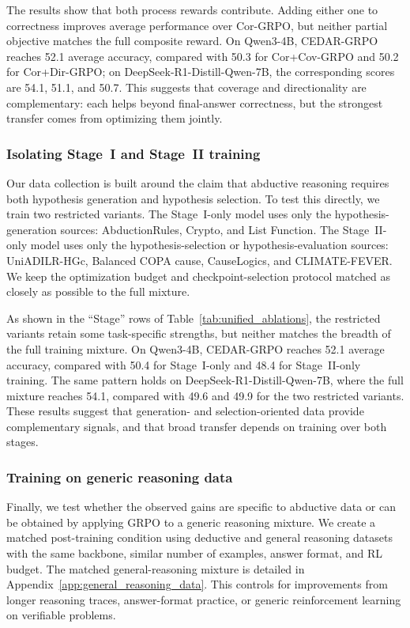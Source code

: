 \documentclass[11pt]{article}
\begin{document}
The results show that both process rewards contribute. Adding either one to correctness improves average performance over Cor-GRPO, but neither partial objective matches the full composite reward. On Qwen3-4B, CEDAR-GRPO reaches 52.1 average accuracy, compared with 50.3 for Cor+Cov-GRPO and 50.2 for Cor+Dir-GRPO; on DeepSeek-R1-Distill-Qwen-7B, the corresponding scores are 54.1, 51.1, and 50.7. This suggests that coverage and directionality are complementary: each helps beyond final-answer correctness, but the strongest transfer comes from optimizing them jointly.


\subsubsection{Isolating Stage~I and Stage~II training}
\label{sec:ablation_stages}

Our data collection is built around the claim that abductive reasoning requires both hypothesis generation and hypothesis selection. To test this directly, we train two restricted variants. The Stage~I-only model uses only the hypothesis-generation sources: AbductionRules, Crypto, and List Function. The Stage~II-only model uses only the hypothesis-selection or hypothesis-evaluation sources: UniADILR-HGc, Balanced COPA cause, CauseLogics, and CLIMATE-FEVER. We keep the optimization budget and checkpoint-selection protocol matched as closely as possible to the full mixture.

As shown in the ``Stage'' rows of Table~\ref{tab:unified_ablations}, the restricted variants retain some task-specific strengths, but neither matches the breadth of the full training mixture. On Qwen3-4B, CEDAR-GRPO reaches 52.1 average accuracy, compared with 50.4 for Stage~I-only and 48.4 for Stage~II-only training. The same pattern holds on DeepSeek-R1-Distill-Qwen-7B, where the full mixture reaches 54.1, compared with 49.6 and 49.9 for the two restricted variants. These results suggest that generation- and selection-oriented data provide complementary signals, and that broad transfer depends on training over both stages.


\subsubsection{Training on generic reasoning data}
\label{sec:ablation_generic_reasoning}

Finally, we test whether the observed gains are specific to abductive data or can be obtained by applying GRPO to a generic reasoning mixture. We create a matched post-training condition using deductive and general reasoning datasets with the same backbone, similar number of examples, answer format, and RL budget. The matched general-reasoning mixture is detailed in Appendix~\ref{app:general_reasoning_data}. This controls for improvements from longer reasoning traces, answer-format practice, or generic reinforcement learning on verifiable problems.
\end{document}
